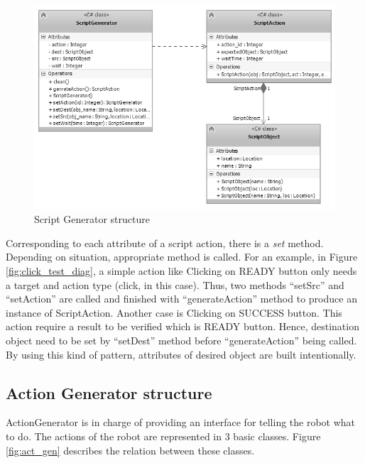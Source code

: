 	\begin{figure}[H]
		\centering
		\includegraphics[scale=0.75]{Chapters/Fig/script_gen.png}
		\caption{Script Generator structure}
		\label{fig:script_gen}
	\end{figure}

Corresponding to each attribute of a script action, there is a \textit{set} method. Depending on situation, appropriate method is called. For an example, in Figure \ref{fig:click_test_diag}, a simple action like Clicking on READY button only needs a target and action type (click, in this case). Thus, two methods ``setSrc'' and ``setAction'' are called and finished with ``generateAction'' method to produce an instance of ScriptAction. Another case is Clicking on SUCCESS button. This action require a result to be verified which is READY button. Hence, destination object need to be set by ``setDest'' method before ``generateAction'' being called. By using this kind of pattern, attributes of desired object are built intentionally.

\subsection{Action Generator structure}
ActionGenerator is in charge of providing an interface for telling the robot what to do. The actions of the robot are represented in 3 basic classes. Figure \ref{fig:act_gen} describes the relation between these classes.

